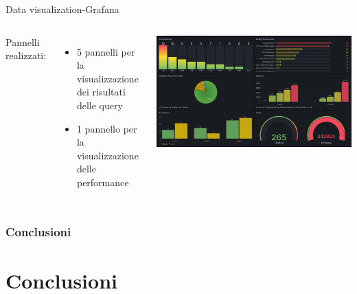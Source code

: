 \documentclass[13pt,aspectratio=169,t,xcolor=table]{beamer}
\begin{document}
\begin{frame}{Data visualization-Grafana}
    \vspace{0.5cm}
    \begin{columns}
            \begin{minipage}[b]{1\textwidth}
                Pannelli realizzati:
                \begin{itemize}
                    \item 5 pannelli per la visualizzazione dei risultati delle query
                    \item 1 pannello per la visualizzazione delle performance
                \end{itemize}
            \end{minipage}
            \begin{minipage}{1\textwidth}
                \begin{adjustbox}{margin=0cm 0cm 1.5cm 0cm, center}
                    \includegraphics[width=1\textwidth]{res/grafana_dashboard.png}
                \end{adjustbox}
            \end{minipage}
    \end{columns}
\end{frame}



\begin{frame}{}
    \frametitle{Conclusioni}
\end{frame}
\section{Conclusioni}
\end{document}
